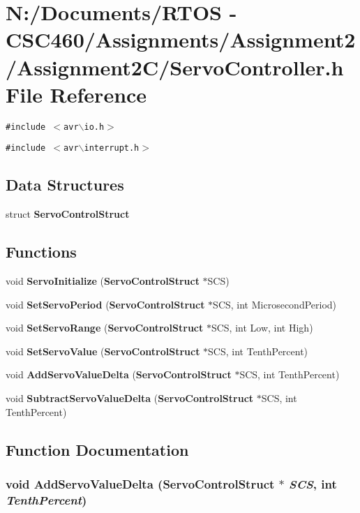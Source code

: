 \section{N:/Documents/RTOS - CSC460/Assignments/Assignment2/Assignment2C/Servo\-Controller.h File Reference}
\label{_servo_controller_8h}
{\tt \#include $<$avr$\backslash$io.h$>$}\par
{\tt \#include $<$avr$\backslash$interrupt.h$>$}\par
\subsection*{Data Structures}
\begin{CompactItemize}
\item 
struct {\bf Servo\-Control\-Struct}
\end{CompactItemize}
\subsection*{Functions}
\begin{CompactItemize}
\item 
void {\bf Servo\-Initialize} ({\bf Servo\-Control\-Struct} $\ast$SCS)
\item 
void {\bf Set\-Servo\-Period} ({\bf Servo\-Control\-Struct} $\ast$SCS, int Microsecond\-Period)
\item 
void {\bf Set\-Servo\-Range} ({\bf Servo\-Control\-Struct} $\ast$SCS, int Low, int High)
\item 
void {\bf Set\-Servo\-Value} ({\bf Servo\-Control\-Struct} $\ast$SCS, int Tenth\-Percent)
\item 
void {\bf Add\-Servo\-Value\-Delta} ({\bf Servo\-Control\-Struct} $\ast$SCS, int Tenth\-Percent)
\item 
void {\bf Subtract\-Servo\-Value\-Delta} ({\bf Servo\-Control\-Struct} $\ast$SCS, int Tenth\-Percent)
\end{CompactItemize}


\subsection{Function Documentation}
\subsubsection{\setlength{\rightskip}{0pt plus 5cm}void Add\-Servo\-Value\-Delta ({\bf Servo\-Control\-Struct} $\ast$ {\em SCS}, int {\em Tenth\-Percent})}\label{_servo_controller_8h_47e5d9700ccc6e36d9f015cda851904c}


